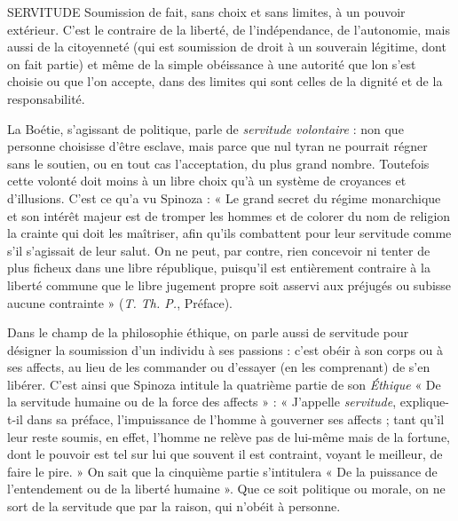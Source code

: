 SERVITUDE Soumission de fait, sans choix et sans limites, à un pouvoir
extérieur. C’est le contraire de la liberté, de l'indépendance, de
l'autonomie, mais aussi de la citoyenneté (qui est soumission de droit à un souverain
légitime, dont on fait partie) et même de la simple obéissance à une
autorité que lon s’est choisie ou que l’on accepte, dans des limites qui sont
celles de la dignité et de la responsabilité.

La Boétie, s'agissant de politique, parle de {\it servitude volontaire} : non que
personne choisisse d’être esclave, mais parce que nul tyran ne pourrait régner
sans le soutien, ou en tout cas l’acceptation, du plus grand nombre. Toutefois
cette volonté doit moins à un libre choix qu’à un système de croyances et d’illusions.
C’est ce qu’a vu Spinoza : « Le grand secret du régime monarchique et
son intérêt majeur est de tromper les hommes et de colorer du nom de religion
la crainte qui doit les maîtriser, afin qu’ils combattent pour leur servitude
comme s’il s'agissait de leur salut. On ne peut, par contre, rien concevoir ni
tenter de plus ficheux dans une libre république, puisqu'il est entièrement
contraire à la liberté commune que le libre jugement propre soit asservi aux
préjugés ou subisse aucune contrainte » ({\it T. Th. P.}, Préface).

Dans le champ de la philosophie éthique, on parle aussi de servitude pour
désigner la soumission d’un individu à ses passions : c’est obéir à son corps ou
à ses affects, au lieu de les commander ou d’essayer (en les comprenant) de s’en
libérer. C’est ainsi que Spinoza intitule la quatrième partie de son {\it Éthique} « De
la servitude humaine ou de la force des affects » : « J'appelle {\it servitude}, explique-t-il
dans sa préface, l'impuissance de l’homme à gouverner ses affects ; tant qu'il
leur reste soumis, en effet, l’homme ne relève pas de lui-même mais de la fortune,
dont le pouvoir est tel sur lui que souvent il est contraint, voyant le
meilleur, de faire le pire. » On sait que la cinquième partie s’intitulera « De la
puissance de l’entendement ou de la liberté humaine ». Que ce soit politique
ou morale, on ne sort de la servitude que par la raison, qui n’obéit à personne.

